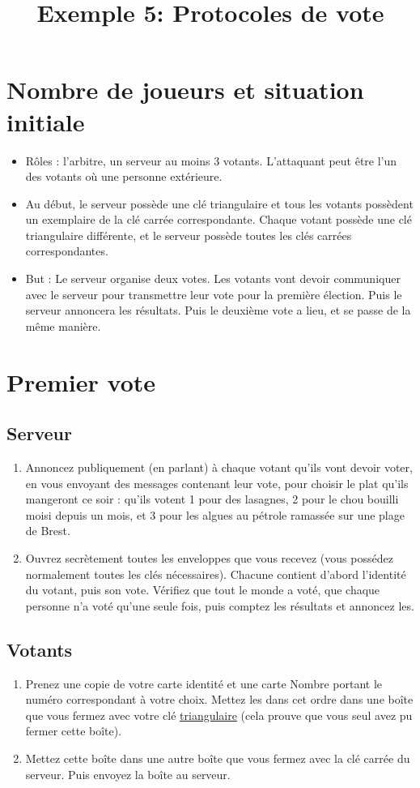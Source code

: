 \documentclass[a4paper,10pt]{article}
\title{Exemple 5: Protocoles de vote}
\begin{document}
\maketitle

\section{Nombre de joueurs et situation initiale}
\begin{itemize}
	\item Rôles : l'arbitre, un serveur au moins 3 votants. L'attaquant peut être l'un des votants où une personne extérieure.
	\item Au début, le serveur possède une clé triangulaire et tous les votants possèdent un exemplaire de la clé carrée correspondante. Chaque votant possède une clé triangulaire différente, et le serveur possède toutes les clés carrées correspondantes.
	\item But : Le serveur organise deux votes. Les votants vont devoir communiquer avec le serveur pour transmettre leur vote pour la première élection. Puis le serveur annoncera les résultats. Puis le deuxième vote a lieu, et se passe de la même manière.
\end{itemize}


\section{Premier vote}
\subsection{Serveur}
	\begin{enumerate}
		\item Annoncez publiquement (en parlant) à chaque votant qu'ils vont devoir voter, en vous envoyant des messages contenant leur vote, pour choisir le plat qu'ils mangeront ce soir : qu'ils votent 1 pour des lasagnes, 2 pour le chou bouilli moisi depuis un mois, et 3 pour les algues au pétrole ramassée sur une plage de Brest.
		\item Ouvrez secrètement toutes les enveloppes que vous recevez (vous possédez normalement toutes les clés nécessaires). Chacune contient d'abord l'identité du votant, puis son vote. Vérifiez que tout le monde a voté, que chaque personne n'a voté qu'une seule fois, puis comptez les résultats et annoncez les.
	\end{enumerate}

\subsection{Votants}
	\begin{enumerate}
		\item Prenez une copie de votre carte identité et une carte Nombre portant le numéro correspondant à votre choix. Mettez les dans cet ordre dans une boîte que vous fermez avec votre clé \underline{triangulaire} (cela prouve que vous seul avez pu fermer cette boîte).
		\item Mettez cette boîte dans une autre boîte que vous fermez avec la clé carrée du serveur. Puis envoyez la boîte au serveur.
	\end{enumerate}
\end{document}
